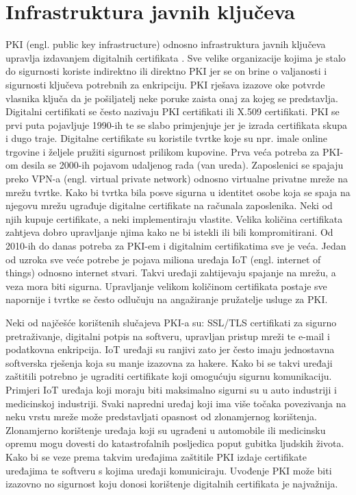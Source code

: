 \documentclass[]{foi}
\begin{document}
\chapter{Infrastruktura javnih ključeva}

PKI (engl. public key infrastructure) odnosno infrastruktura javnih ključeva upravlja izdavanjem digitalnih certifikata
\cite{keyfactor-pki}.
Sve velike organizacije kojima je stalo do sigurnosti koriste indirektno ili direktno PKI jer se on brine o valjanosti i sigurnosti ključeva potrebnih za enkripciju.
PKI rješava izazove oke potvrde vlasnika ključa da je pošiljatelj neke poruke zaista onaj za kojeg se predstavlja.
Digitalni certifikati se često nazivaju PKI certifikati ili X.509 certifikati.
PKI se prvi puta pojavljuje 1990-ih te se slabo primjenjuje jer je izrada certifikata skupa i dugo traje.
Digitalne certifikate su koristile tvrtke koje su npr. imale online trgovine i željele pružiti sigurnost prilikom kupovine.
Prva veća potreba za PKI-om desila se 2000-ih pojavom udaljenog rada (van ureda).
Zaposlenici se spajaju preko VPN-a (engl. virtual private network) odnosno virtualne privatne mreže na mrežu tvrtke.
Kako bi tvrtka bila posve sigurna u identitet osobe koja se spaja na njegovu mrežu ugrađuje digitalne certifikate na računala zaposlenika.
Neki od njih kupuje certifikate, a neki implementiraju vlastite.
Velika količina certifikata zahtjeva dobro upravljanje njima kako ne bi istekli ili bili kompromitirani.
Od 2010-ih do danas potreba za PKI-em i digitalnim certifikatima sve je veća.
Jedan od uzroka sve veće potrebe je pojava miliona uređaja IoT (engl. internet of things) odnosno internet stvari.
Takvi uređaji zahtijevaju spajanje na mrežu, a veza mora biti sigurna.
Upravljanje velikom količinom certifikata postaje sve napornije i tvrtke se često odlučuju na angažiranje pružatelje usluge za PKI.

Neki od najčešće korištenih slučajeva PKI-a su: SSL/TLS certifikati za sigurno pretraživanje, digitalni potpis na softveru, upravljan pristup mreži te e-mail i podatkovna enkripcija.
IoT uređaji su ranjivi zato jer često imaju jednostavna softverska rješenja koja su manje izazovna za hakere.
Kako bi se takvi uređaji zaštitili potrebno je ugraditi certifikate koji omogućuju sigurnu komunikaciju.
Primjeri IoT uređaja koji moraju biti maksimalno sigurni su u auto industriji i medicinskoj industriji.
Svaki napredni uređaj koji ima više točaka povezivanja na neku vrstu mreže može predstavljati opasnost od zlonamjernog korištenja.
Zlonamjerno korištenje uređaja koji su ugrađeni u automobile ili medicinsku opremu mogu dovesti do katastrofalnih posljedica poput gubitka ljudskih života.
Kako bi se veze prema takvim uređajima zaštitile PKI izdaje certifikate uređajima te softveru s kojima uređaji komuniciraju.
Uvođenje PKI može biti izazovno no sigurnost koju donosi korištenje digitalnih certifikata je najvažnija.
\end{document}
